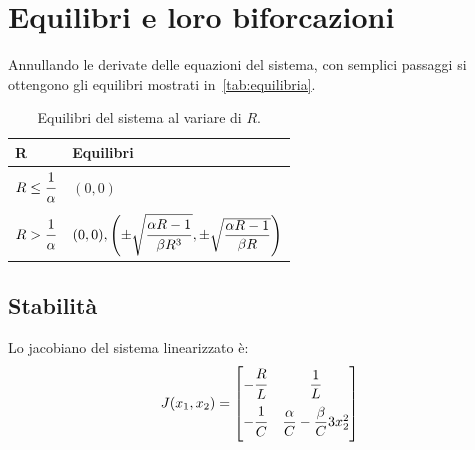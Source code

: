 \section{Equilibri e loro biforcazioni}
Annullando le derivate delle equazioni del sistema, con semplici passaggi si ottengono gli equilibri mostrati in~\autoref{tab:equilibria}.

\begin{table}
    \centering
    \begin{tabular}{l | l}
        \textbf{R} & \textbf{Equilibri}\\
        \hline
        $R \le \dfrac{\strut 1}{\strut\alpha}$ & $(0, 0)$\\
        $R > \dfrac{\strut 1}{\strut\alpha}$ & $(0,0),
        \left( \pm \sqrt{\dfrac{\strut\alpha R -1}{\strut\beta R^3}}, \pm \sqrt{\dfrac{\alpha R -1}{\beta R}} \right)$
    \end{tabular}
    \caption{Equilibri del sistema al variare di $R$.}
    \label{tab:equilibria}
\end{table}

\subsection{Stabilità}
Lo jacobiano del sistema linearizzato è:
\begin{equation}
J(x_1,x_2) =
\begin{bmatrix}
-\dfrac{\strut R}{L\strut} & \dfrac{1}{L} \\
-\dfrac{\strut 1}{C\strut} & \dfrac{\alpha}{C}-\dfrac{\beta}{C} 3x_2^2 \\
\end{bmatrix}
\end{equation}

